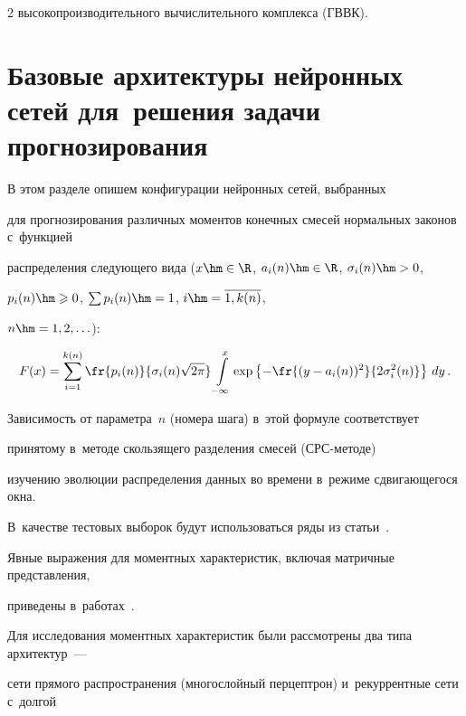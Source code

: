 \begin{multicols}{2}
высокопроизводительного вычислительного комплекса (ГВВК).





\section{Базовые архитектуры нейронных сетей для~решения задачи прогнозирования}




В этом разделе опишем конфигурации нейронных сетей, выбранных 

для прогнозирования различных моментов конечных смесей нормальных законов с~функцией 

распределения следующего вида ($x \hm\in \R$, $a_i(n)\hm\in\R$, $\sigma_i(n)\hm>0$, 

$p_{i}(n)\hm\geqslant 0$, $\sum p_{i}(n)\hm=1$, $i\hm=\overline{1,k(n)}$, 

$n\hm=1,2,\ldots$):

\begin{equation*}

\label{Mixture}

F(x)=\sum\limits_{i=1}^{k(n)}

\fr{p_i(n)}{\sigma_i(n)\sqrt{2\pi}}\int\limits_{-\infty}^{x}

\exp\left\{-\fr{(y-a_i(n))^2}

{2\sigma_i^2(n)}\right\}\,dy\,.

\end{equation*}



Зависимость от параметра~$n$ (номера шага) в~этой формуле соответствует 

принятому в~методе скользящего разделения смесей (СРС-ме\-то\-де) 

изучению эволюции распределения данных во времени в~режиме сдвигающегося окна. 

В~качестве тестовых выборок будут использоваться ряды из статьи~\cite{Gorshenin2019a}.

 Явные выражения для моментных характеристик, включая матричные представления, 

 приведены в~работах~\cite{Gorshenin2016a,Gorshenin2019b}.



Для исследования моментных характеристик были рассмотрены два типа архитектур~--- 

сети прямого распространения (многослойный перцептрон) и~рекуррентные сети с~долгой 


\end{multicols}
